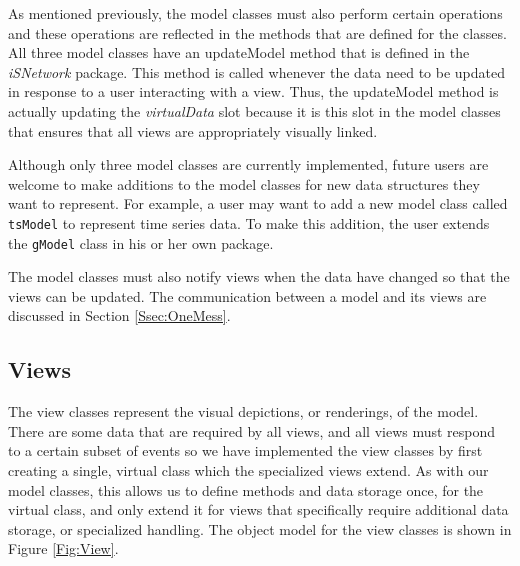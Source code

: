\documentclass{article}[11pt]
\newcommand{\Rfunction}[1]{{\textsf{#1}}}
\newcommand{\Rpackage}[1]{{\textit{#1}}}
\newcommand{\Rslot}[1]{\textsl{#1}}
\newcommand{\Rclass}[1]{\texttt{#1}}
\begin{document}
As mentioned previously, the model classes must also perform certain
operations and these operations are reflected in the methods that are defined
for the classes.  All three model classes have an \Rfunction{updateModel}
method that is defined in the \Rpackage{iSNetwork} package.  This method is
called whenever the data need to be updated in response to a user interacting
with a view.  Thus, the \Rfunction{updateModel} method is actually updating the
\Rslot{virtualData} slot because it is this slot in the model classes
that ensures that all views are appropriately visually linked.  

Although only three model classes are currently implemented, future
users are welcome to make additions to the model classes for new data
structures they want to represent.  For example, a user may want to add a new
model class called \Rclass{tsModel} to represent time series data.
To make this addition, the user extends the \Rclass{gModel} class in his or
her own package. 

The model classes must also notify views when the data have changed
so that the views can be updated.  The communication between a model and its
views are discussed in Section \ref{Ssec:OneMess}. 

\subsection{Views}
\label{Ssec:OneViews}

The view classes represent the visual depictions, or renderings, of
the model.  There are some data that are required by all views, and all views
must respond to a certain subset of events so we have implemented the view
classes by first creating a single, virtual class which the specialized
views extend.  As with our model classes, this allows us to define
methods and data storage once, for the virtual class, and only extend
it for views that specifically require additional data storage, or
specialized handling.  The object model for the view classes is shown
in Figure \ref{Fig:View}.
\end{document}
